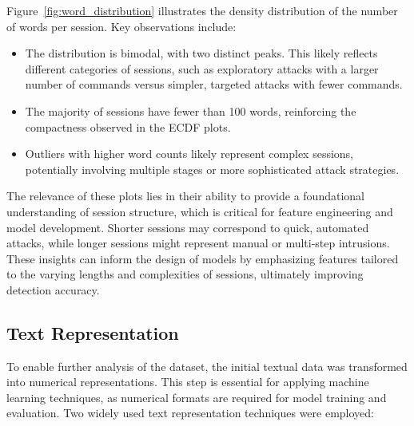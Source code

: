         Figure~\ref{fig:word_distribution} illustrates the density distribution of the number of words per session. Key observations include:
        
        \begin{itemize}
        
            \item The distribution is bimodal, with two distinct peaks. This likely reflects different categories of sessions, such as exploratory attacks with a larger number of commands versus simpler, targeted attacks with fewer commands.
            
            \vspace{0.2em}
            
            \item The majority of sessions have fewer than 100 words, reinforcing the compactness observed in the ECDF plots.
            
            \vspace{0.2em}
            
            \item Outliers with higher word counts likely represent complex sessions, potentially involving multiple stages or more sophisticated attack strategies.
            
        \end{itemize}

        The relevance of these plots lies in their ability to provide a foundational understanding of session structure, which is critical for feature engineering and model development. Shorter sessions may correspond to quick, automated attacks, while longer sessions might represent manual or multi-step intrusions. These insights can inform the design of models by emphasizing features tailored to the varying lengths and complexities of sessions, ultimately improving detection accuracy.

    \subsection{Text Representation}

        To enable further analysis of the dataset, the initial textual data was transformed into numerical representations. This step is essential for applying machine learning techniques, as numerical formats are required for model training and evaluation. Two widely used text representation techniques were employed:

